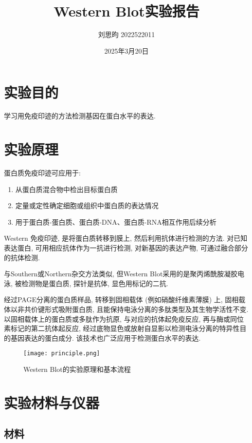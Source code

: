 \documentclass{article}
\title{Western Blot实验报告}
\author{刘思昀 2022522011}
\date{2025年3月20日}
\begin{document}
\maketitle

\section{实验目的}
学习用免疫印迹的方法检测基因在蛋白水平的表达.

\section{实验原理}

蛋白质免疫印迹可应用于:
\begin{enumerate}
    \item 从蛋白质混合物中检出目标蛋白质
    \item 定量或定性确定细胞或组织中蛋白质的表达情况
    \item 用于蛋白质-蛋白质、蛋白质-DNA、蛋白质-RNA相互作用后续分析
\end{enumerate}

Western 免疫印迹, 是将蛋白质转移到膜上, 然后利用抗体进行检测的方法. 对已知表达蛋白, 可用相应抗体作为一抗进行检测, 对新基因的表达产物, 可通过融合部分的抗体检测.

与Southern或Northern杂交方法类似, 但Western Blot采用的是聚丙烯酰胺凝胶电泳, 被检测物是蛋白质, 探针是抗体, 显色用标记的二抗.

经过PAGE分离的蛋白质样品, 转移到固相载体 (例如硝酸纤维素薄膜) 上, 固相载体以非共价键形式吸附蛋白质, 且能保持电泳分离的多肽类型及其生物学活性不变. 以固相载体上的蛋白质或多肽作为抗原, 与对应的抗体起免疫反应, 再与酶或同位素标记的第二抗体起反应, 经过底物显色或放射自显影以检测电泳分离的特异性目的基因表达的蛋白成分. 该技术也广泛应用于检测蛋白水平的表达.

\begin{figure}
    \centering
    \texttt{[image: principle.png]}
    \caption{Western Blot的实验原理和基本流程}
\end{figure}

\newpage

\section{实验材料与仪器}

\subsection{材料}
\end{document}
